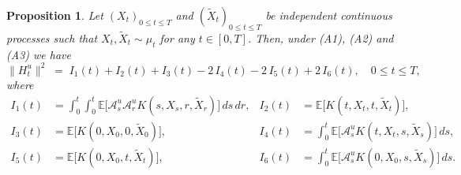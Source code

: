 \documentclass[11pt,leqno]{article}
\theoremstyle{plain}
\newtheorem{prop}{Proposition}
\theoremstyle{remark}
\theoremstyle{definition}
\numberwithin{equation}{section}
\numberwithin{figure}{section}
\numberwithin{table}{section}
\begin{document}
\begin{prop}\label{prop:Ht-norm}
Let $(X_t)_{0\le t\le T}$ and $(\tilde{X}_t)_{0\le t\le T}$ be independent continuous processes such that $X_t,\tilde{X}_t\sim\mu_t$ for any $t\in [0,T]$.
Then, under {\rm (A1)}, {\rm (A2)} and {\rm (A3)} we have
\begin{equation}\label{eq:Ht-six-terms}
 \|H_t^u\|^2 \;=\; I_1(t) + I_2(t) + I_3(t) - 2\,I_4(t) - 2\,I_5(t) + 2\,I_6(t), \quad 0\le t\le T, 
\end{equation}
where 
\begin{equation}\label{eq:Ik-defs}
\begin{aligned}
 I_1(t) &= \int_0^t\!\!\int_0^t\mathbb{E}\bigl[\mathcal{A}^u_{s}\mathcal{A}^u_{r}K(s,X_s,r,\tilde{X}_r)\bigr]\,ds\,dr,
 & I_2(t) &= \mathbb{E}\bigl[K(t,X_t,t,\tilde{X}_t)\bigr],\\
 I_3(t) &= \mathbb{E}\bigl[K(0,X_0,0,\tilde{X}_0)\bigr],
 & I_4(t) &= \int_0^t\!\mathbb{E}\bigl[\mathcal{A}^u_{s}K(t,X_t,s,\tilde{X}_s)\bigr]\,ds,\\
 I_5(t) &= \mathbb{E}\bigl[K(0,X_0,t,\tilde{X}_t)\bigr],
 & I_6(t) &= \int_0^t\!\mathbb{E}\bigl[\mathcal{A}^u_{s}K(0,X_0,s,\tilde{X}_s)\bigr]\,ds.
\end{aligned}
\end{equation}
\end{prop}
\end{document}
